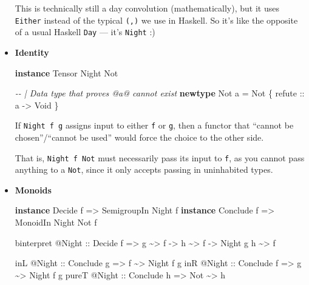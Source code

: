 \documentclass[]{article}
\newenvironment{Shaded}{}{}
\newcommand{\CommentTok}[1]{\textcolor[rgb]{0.38,0.63,0.69}{\textit{#1}}}
\newcommand{\DataTypeTok}[1]{\textcolor[rgb]{0.56,0.13,0.00}{#1}}
\newcommand{\KeywordTok}[1]{\textcolor[rgb]{0.00,0.44,0.13}{\textbf{#1}}}
\newcommand{\NormalTok}[1]{#1}
\newcommand{\OperatorTok}[1]{\textcolor[rgb]{0.40,0.40,0.40}{#1}}
\newcommand{\OtherTok}[1]{\textcolor[rgb]{0.00,0.44,0.13}{#1}}
\begin{document}
\begin{itemize}
  This is technically still a day convolution (mathematically), but it uses
  \texttt{Either} instead of the typical \texttt{(,)} we use in Haskell. So it's
  like the opposite of a usual Haskell \texttt{Day} --- it's \texttt{Night} :)
\item
  \textbf{Identity}

\begin{Shaded}
\begin{Highlighting}[]
\KeywordTok{instance} \DataTypeTok{Tensor} \DataTypeTok{Night} \DataTypeTok{Not}

\CommentTok{{-}{-} | Data type that proves @a@ cannot exist}
\KeywordTok{newtype} \DataTypeTok{Not}\NormalTok{ a }\OtherTok{=} \DataTypeTok{Not}\NormalTok{ \{}\OtherTok{ refute ::}\NormalTok{ a }\OtherTok{{-}>} \DataTypeTok{Void}\NormalTok{ \}}
\end{Highlighting}
\end{Shaded}

  If \texttt{Night\ f\ g} assigns input to either \texttt{f} or \texttt{g}, then
  a functor that ``cannot be chosen''/``cannot be used'' would force the choice
  to the other side.

  That is, \texttt{Night\ f\ Not} must necessarily pass its input to \texttt{f},
  as you cannot pass anything to a \texttt{Not}, since it only accepts passing
  in uninhabited types.
\item
  \textbf{Monoids}

\begin{Shaded}
\begin{Highlighting}[]
\KeywordTok{instance} \DataTypeTok{Decide}\NormalTok{   f }\OtherTok{=>} \DataTypeTok{SemigroupIn} \DataTypeTok{Night}\NormalTok{ f}
\KeywordTok{instance} \DataTypeTok{Conclude}\NormalTok{ f }\OtherTok{=>} \DataTypeTok{MonoidIn}    \DataTypeTok{Night} \DataTypeTok{Not}\NormalTok{ f}

\NormalTok{binterpret }\OperatorTok{@}\DataTypeTok{Night}
\OtherTok{    ::} \DataTypeTok{Decide}\NormalTok{ f}
    \OtherTok{=>}\NormalTok{ g }\OperatorTok{\textasciitilde{}>}\NormalTok{ f}
    \OtherTok{{-}>}\NormalTok{ h }\OperatorTok{\textasciitilde{}>}\NormalTok{ f}
    \OtherTok{{-}>} \DataTypeTok{Night}\NormalTok{ g h }\OperatorTok{\textasciitilde{}>}\NormalTok{ f}

\NormalTok{inL   }\OperatorTok{@}\DataTypeTok{Night}\OtherTok{ ::} \DataTypeTok{Conclude}\NormalTok{ g }\OtherTok{=>}\NormalTok{ f   }\OperatorTok{\textasciitilde{}>} \DataTypeTok{Night}\NormalTok{ f g}
\NormalTok{inR   }\OperatorTok{@}\DataTypeTok{Night}\OtherTok{ ::} \DataTypeTok{Conclude}\NormalTok{ f }\OtherTok{=>}\NormalTok{ g   }\OperatorTok{\textasciitilde{}>} \DataTypeTok{Night}\NormalTok{ f g}
\NormalTok{pureT }\OperatorTok{@}\DataTypeTok{Night}\OtherTok{ ::} \DataTypeTok{Conclude}\NormalTok{ h }\OtherTok{=>} \DataTypeTok{Not} \OperatorTok{\textasciitilde{}>}\NormalTok{ h}
\end{Highlighting}
\end{Shaded}


\end{itemize}
\end{document}
